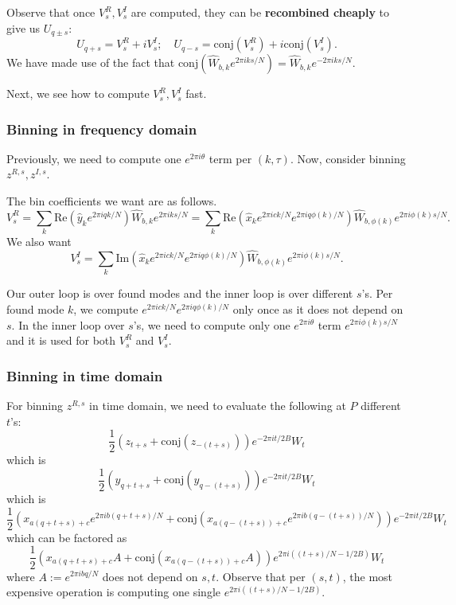 \documentclass[10pt]{article}
\begin{document}
Observe that once $V^R_s,V^I_s$ are computed, they can be \textbf{recombined cheaply} to give us $U_{q\pm s}$:
$$U_{q+s} = V^{R}_s + i V^I_s; \quad U_{q-s} = \text{conj}(V^{R}_s) + i \text{conj}(V^{I}_s).$$
We have made use of the fact that $\text{conj}(\hat{W}_{b,k} e^{2\pi i ks/N}) = \hat{W}_{b,k} e^{-2\pi i ks/N}$.

Next, we see how to compute $V^R_s, V^I_{s}$ fast.

\subsubsection{Binning in frequency domain}

Previously, we need to compute one $e^{2\pi i \theta}$ term per $(k, \tau)$. Now, consider binning $z^{R,s},z^{I,s}$.

The bin coefficients we want are as follows.
$$V^R_s = \sum_k \text{Re}(\hat{y}_k e^{2\pi i qk/N}) \hat{W}_{b,k} e^{2\pi i k s/N} = \sum_k \text{Re}(\hat{x}_k e^{2\pi i ck/N} e^{2\pi i q \phi(k)/N})\hat{W}_{b,\phi(k)} e^{2\pi i \phi(k) s/N}.$$
We also want
$$V^I_s = \sum_k \text{Im}(\hat{x}_k e^{2\pi i ck/N} e^{2\pi i q \phi(k)/N})\hat{W}_{b,\phi(k)} e^{2\pi i \phi(k) s/N}.$$

Our outer loop is over found modes and the inner loop is over different $s$'s. Per found mode $k$, we compute $e^{2\pi i ck/N} e^{2\pi i q \phi(k)/N}$ only once as it does not depend on $s$. In the inner loop over $s$'s, we need to compute only one $e^{2\pi i \theta}$ term $e^{2\pi i \phi(k)s/N}$ and it is used for both $V^R_s$ and $V^I_s$.


\subsubsection{Binning in time domain}
For binning $z^{R,s}$ in time domain, we need to evaluate the following at $P$ different $t$'s:
$$\frac{1}{2} ( z_{t+s} + \text{conj}(z_{-(t+s)})) e^{-2\pi i t/2B} W_t$$
which is
$$\frac{1}{2}(y_{q+t+s} + \text{conj}(y_{q-(t+s)})) e^{-2\pi i t/2B}W_t$$
which is
$$\frac{1}{2}\left(x_{a(q+t+s)+c}e^{2\pi i b(q+t+s)/N} + \text{conj}(x_{a(q-(t+s))+c} e^{2\pi i b(q-(t+s))/N})\right) e^{-2\pi i t/2B}W_t$$
which can be factored as
$$\frac{1}{2} \left( x_{a(q+t+s)+c} A + \text{conj}(x_{a(q-(t+s))+c} A)\right)e^{2\pi i ((t+s)/N - 1/2B)} W_t $$
where $A:= e^{2\pi i bq/N}$ does not depend on $s, t$. Observe that per $(s, t)$, the most expensive operation is computing one single $e^{2\pi i ((t+s)/N - 1/2B)}$.
\end{document}
